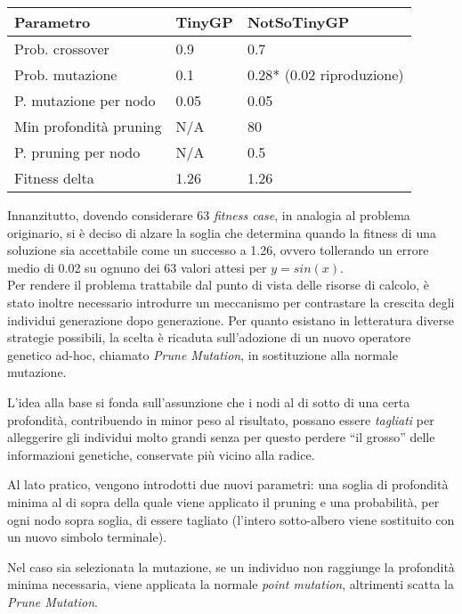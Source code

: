 \documentclass{../llncs}
\begin{document}
\begin{table}
\begin{tabular}{l | p{2.7cm} | p{4.3cm}}
\textbf{Parametro}		& \textbf{TinyGP} 	& \textbf{NotSoTinyGP} 		\\ \hline
Prob. crossover 		& 0.9				& 0.7 						\\ \hline
Prob. mutazione			& 0.1 				& 0.28* (0.02 riproduzione) \\ \hline
P. mutazione per nodo 	& 0.05 				& 0.05 						\\ \hline
Min profondità pruning 	& N/A 				& 80 						\\ \hline
P. pruning per nodo 	& N/A 				& 0.5						\\ \hline
Fitness delta 			& 1.26 				& 1.26					 	\\ %
\end{tabular}
\caption{} \label{tableSinParams}
\end{table}

Innanzitutto, dovendo considerare 63 \emph{fitness case}, in analogia al problema originario, si è deciso di alzare la soglia che determina quando la fitness di una soluzione sia accettabile come un successo a 1.26, ovvero tollerando un errore medio di 0.02 su ognuno dei 63 valori attesi per $y=sin(x)$.\\

Per rendere il problema trattabile dal punto di vista delle risorse di calcolo, è stato inoltre necessario introdurre un meccanismo per contrastare la crescita degli individui generazione dopo generazione. Per quanto esistano in letteratura diverse strategie possibili, la scelta è ricaduta sull'adozione di un nuovo operatore genetico ad-hoc, chiamato \emph{Prune Mutation}, in sostituzione alla normale mutazione.

L'idea alla base si fonda sull'assunzione che i nodi al di sotto di una certa profondità, contribuendo in minor peso al risultato, possano essere \emph{tagliati} per alleggerire gli individui molto grandi senza per questo perdere ``il grosso'' delle informazioni genetiche, conservate più vicino alla radice.

Al lato pratico, vengono introdotti due nuovi parametri: una soglia di profondità minima al di sopra della quale viene applicato il pruning e una probabilità, per ogni nodo sopra soglia, di essere tagliato (l'intero sotto-albero viene sostituito con un nuovo simbolo terminale).

Nel caso sia selezionata la mutazione, se un individuo non raggiunge la profondità minima necessaria, viene applicata la normale \emph{point mutation}, altrimenti scatta la \emph{Prune Mutation}.\\
\end{document}
